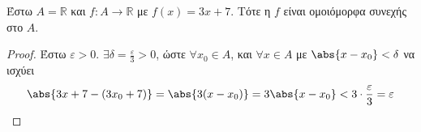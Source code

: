 \begin{example}
  Έστω $ A = \mathbb{R} $ και $ f \colon A \to \mathbb{R} $ με $ f(x)=3x+7 $. Τότε 
  η $f$ είναι ομοιόμορφα συνεχής στο $A$.
\end{example}
\begin{proof}
  Έστω $ \varepsilon >0 $. $ \exists \delta = \frac{\varepsilon}{3} >0 $, ώστε 
  $ \forall x_{0} \in A $, και $ \forall x \in A $ με $ \abs{x - x_{0}} < \delta $ να 
  ισχύει
  \[
    \abs{3x+7-(3x_{0}+7)} = \abs{3(x-x_{0})} = 3 \abs{x- x_{0}} < 3\cdot 
    \frac{\varepsilon}{3} = \varepsilon
  \]
\end{proof}



